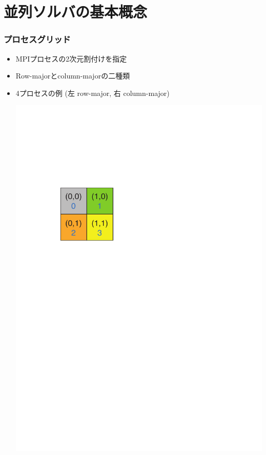 \section{並列ソルバの基本概念}

\begin{frame}
  \frametitle{プロセスグリッド}
  \begin{itemize}
  \item MPIプロセスの2次元割付けを指定
  \item Row-majorとcolumn-majorの二種類
  \item 4プロセスの例 (左 row-major, 右 column-major)
  \begin{center}
    \includegraphics[height=0.25\textheight]{figure/grid-row-major.pdf} \ \ \ \

\end{center}
\end{itemize}
\end{frame}
